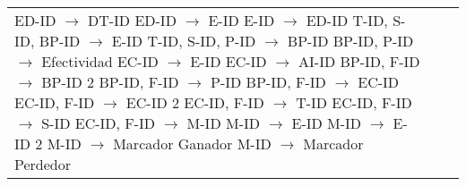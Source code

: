 \documentclass{report}
\begin{document}
\begin{tabularx}{\textwidth}{|X|X|X|}
        ED-ID $\rightarrow$ DT-ID \newline 
        ED-ID $\rightarrow$ E-ID \newline 
        E-ID $\rightarrow$ ED-ID \newline 
        T-ID, S-ID, BP-ID $\rightarrow$ E-ID \newline 
        T-ID, S-ID, P-ID $\rightarrow$ BP-ID \newline 
        BP-ID, P-ID $\rightarrow$ Efectividad \newline 
        EC-ID $\rightarrow$ E-ID \newline 
        EC-ID $\rightarrow$ AI-ID \newline 
        BP-ID, F-ID $\rightarrow$ BP-ID 2 \newline 
        BP-ID, F-ID $\rightarrow$ P-ID \newline 
        BP-ID, F-ID $\rightarrow$ EC-ID \newline 
        EC-ID, F-ID $\rightarrow$ EC-ID 2 \newline 
        EC-ID, F-ID $\rightarrow$ T-ID \newline 
        EC-ID, F-ID $\rightarrow$ S-ID \newline 
        EC-ID, F-ID $\rightarrow$ M-ID \newline 
        M-ID $\rightarrow$ E-ID \newline 
        M-ID $\rightarrow$ E-ID 2 \newline 
        M-ID $\rightarrow$ Marcador Ganador \newline 
        M-ID $\rightarrow$ Marcador Perdedor & 


\end{tabularx}
\end{document}
